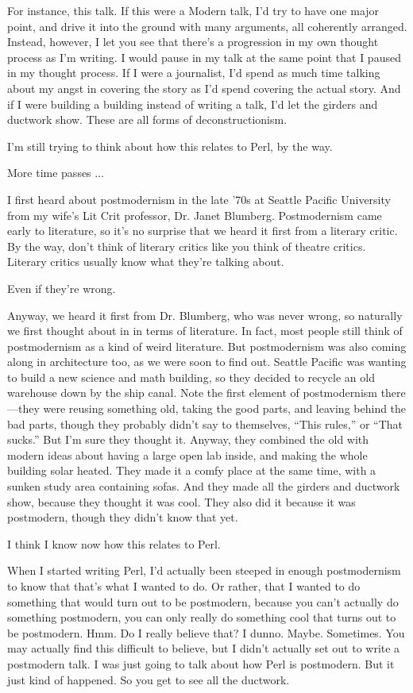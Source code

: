 For instance, this talk. If this were a Modern talk, I'd try to have one
major point, and drive it into the ground with many arguments, all coherently
arranged. Instead, however, I let you see that there's a progression in my
own thought process as I'm writing. I would pause in my talk at the same
point that I paused in my thought process. If I were a journalist, I'd spend
as much time talking about my angst in covering the story as I'd spend
covering the actual story. And if I were building a building instead of
writing a talk, I'd let the girders and ductwork show. These are all forms of
deconstructionism.

I'm still trying to think about how this relates to Perl, by the way.

More time passes $\ldots$

I first heard about postmodernism in the late '70s at Seattle Pacific
University from my wife's Lit Crit professor, Dr. Janet Blumberg.
Postmodernism came early to literature, so it's no surprise that we heard it
first from a literary critic. By the way, don't think of literary critics
like you think of theatre critics. Literary critics usually know what they're
talking about.

Even if they're wrong.

Anyway, we heard it first from Dr. Blumberg, who was never wrong, so
naturally we first thought about in in terms of literature. In fact, most
people still think of postmodernism as a kind of weird literature. But
postmodernism was also coming along in architecture too, as we were soon to
find out. Seattle Pacific was wanting to build a new science and math
building, so they decided to recycle an old warehouse down by the ship canal.
Note the first element of postmodernism there---they were reusing something
old, taking the good parts, and leaving behind the bad parts, though they
probably didn't say to themselves, ``This rules,'' or ``That sucks.'' But
I'm sure they thought it. Anyway, they combined the old with modern ideas
about having a large open lab inside, and making the whole building solar
heated. They made it a comfy place at the same time, with a sunken study area
containing sofas. And they made all the girders and ductwork show, because
they thought it was cool. They also did it because it was postmodern, though
they didn't know that yet.

I think I know now how this relates to Perl.

When I started writing Perl, I'd actually been steeped in enough
postmodernism to know that that's what I wanted to do. Or rather, that I
wanted to do something that would turn out to be postmodern, because you
can't actually do something postmodern, you can only really do something cool
that turns out to be postmodern. Hmm. Do I really believe that? I dunno.
Maybe. Sometimes. You may actually find this difficult to believe, but I
didn't actually set out to write a postmodern talk. I was just going to talk
about how Perl is postmodern. But it just kind of happened. So you get to see
all the ductwork.

